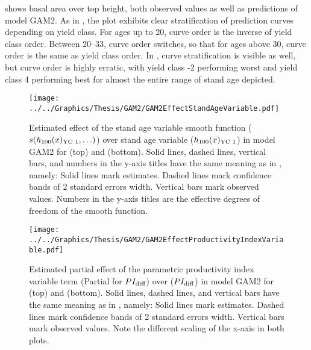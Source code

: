  shows basal area over top height, both observed values as well as predictions of model GAM2.  As in , the \Beech{} plot exhibits clear stratification of prediction curves depending on yield class.  For ages up to \SI{20}{\year}, curve order is the inverse of yield class order. Between \SIrange{20}{33}{\year}, curve order switches, so that for ages above \SI{30}{\year}, curve order is the same as yield class order.  In \Spruce{}, curve stratification is visible as well, but curve order is highly erratic, with yield class -2 performing worst and yield class 4 performing best for almost the entire range of stand age depicted.

\begin{figure}[h]
  \centering
  \texttt{[image: ../../Graphics/Thesis/GAM2/GAM2EffectStandAgeVariable.pdf]}
  \caption{Estimated effect of the stand age variable smooth function (\(s(h_{100}(x)_{\text{YC 1}}{}, \ldots)\)) over stand age variable (\(h_{100}(x)_{\text{YC 1}}{}\)) in model GAM2 for \Beech{} (top) and \Spruce{} (bottom).   Solid lines, dashed lines, vertical bars, and numbers in the y-axis titles have the same meaning as in , namely:  Solid lines mark estimates.  Dashed lines mark confidence bands of 2 standard errors width.  Vertical bars mark observed values.  Numbers in the y-axis titles are the effective degrees of freedom of the smooth function.}
  \label{fig:GAM2EffectStandAgeVariable}
\end{figure}

\begin{figure}[h]
  \centering
  \texttt{[image: ../../Graphics/Thesis/GAM2/GAM2EffectProductivityIndexVariable.pdf]}
  \caption{Estimated partial effect of the parametric productivity index variable term (Partial for \(PI_{\text{diff}}{}\)) over \ProductivityIndexVariableText{} (\(PI_{\text{diff}}{}\)) in model GAM2 for \Beech{} (top) and \Spruce{} (bottom).   Solid lines, dashed lines, and vertical bars have the same meaning as in , namely:  Solid lines mark estimates.  Dashed lines mark confidence bands of 2 standard errors width.  Vertical bars mark observed values.  Note the different scaling of the x-axis in both plots.}
  \label{fig:GAM2EffectProductivityIndexVariable}
\end{figure}


